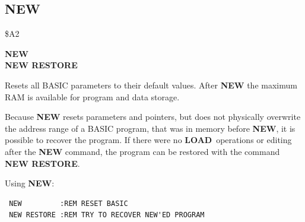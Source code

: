 
\newpage
\subsection{NEW}
\begin{description}[leftmargin=2cm,style=nextline]
\item [Token:] \$A2
\item [Format:] {\bf NEW} \\
                {\bf NEW RESTORE}
\item [Usage:]  Resets all BASIC parameters
                to their default values.
                After {\bf NEW} the maximum RAM is available
                for program and data storage.

                Because {\bf NEW} resets parameters and pointers,
                but does not physically overwrite the address
                range of a BASIC program, that was in memory
                before {\bf NEW}, it is possible to recover the
                program. If there were no {\bf LOAD} operations
                or editing after the {\bf NEW} command, the program
                can be restored with the command \\
                {\bf NEW RESTORE}.
\item [Example:] Using {\bf NEW}:
\begin{tcolorbox}[colback=black,coltext=white]
\verbatimfont{\codefont}
\begin{verbatim}
 NEW         :REM RESET BASIC
 NEW RESTORE :REM TRY TO RECOVER NEW'ED PROGRAM
\end{verbatim}
\end{tcolorbox}
\end{description}


\newpage
